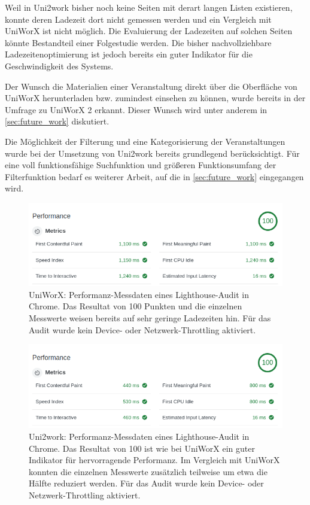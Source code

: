 \documentclass[11pt,a4paper,twoside,ngerman]{article}
\begin{document}
Weil in Uni2work bisher noch keine Seiten mit derart langen Listen existieren, konnte deren Ladezeit dort nicht gemessen werden und ein Vergleich mit UniWorX ist nicht möglich. Die Evaluierung der Ladezeiten auf solchen Seiten könnte Bestandteil einer Folgestudie werden. Die bisher nachvollziehbare Ladezeitenoptimierung ist jedoch bereits ein guter Indikator für die Geschwindigkeit des Systems.

Der Wunsch die Materialien einer Veranstaltung direkt über die Oberfläche von UniWorX herunterladen bzw. zumindest einsehen zu können, wurde bereits in der Umfrage zu UniWorX 2 erkannt. Dieser Wunsch wird unter anderem in \autoref{sec:future_work} diskutiert.

Die Möglichkeit der Filterung und eine Kategorisierung der Veranstaltungen wurde bei der Umsetzung von Uni2work bereits grundlegend berücksichtigt. Für eine voll funktionsfähige Suchfunktion und größeren Funktionsumfang der Filterfunktion bedarf es weiterer Arbeit, auf die in \autoref{sec:future_work} eingegangen wird.

\begin{figure}[h]
    \centering
    \includegraphics[width=.8\textwidth]{images/uniworxlighthouse.png}
    \caption{UniWorX: Performanz-Messdaten eines Lighthouse-Audit in Chrome. Das Resultat von 100 Punkten und die einzelnen Messwerte weisen bereits auf sehr geringe Ladezeiten hin. Für das Audit wurde kein Device- oder Netzwerk-Throttling aktiviert.}
    \label{fig:uniworx_lighthouse}
\end{figure}

\begin{figure}[h]
    \centering
    \includegraphics[width=.8\textwidth]{images/uni2worklighthous.png}
    \caption{Uni2work: Performanz-Messdaten eines Lighthouse-Audit in Chrome. Das Resultat von 100 ist wie bei UniWorX ein guter Indikator für hervorragende Performanz. Im Vergleich mit UniWorX konnten die einzelnen Messwerte zusätzlich teilweise um etwa die Hälfte reduziert werden. Für das Audit wurde kein Device- oder Netzwerk-Throttling aktiviert.}
    \label{fig:uni2work_lighthouse}
\end{figure}
\end{document}
